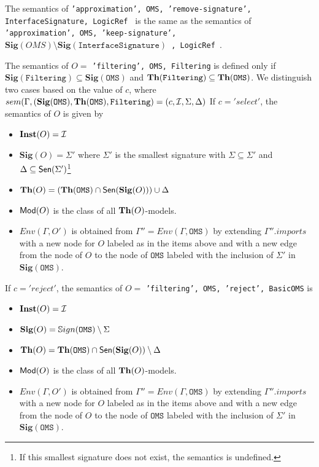 \documentclass[10pt,fleqn,%
\ifpretendfinal
final%
\else
draft%
\fi,
]{scrreprt}
\newcommand*{\syntax}[1]{\texttt{#1}}
\newcommand{\Sig}{\mathbf{Sig}}
\newcommand{\Inst}{\ensuremath{\mathbf{Inst}}}
\begin{document}
The semantics of 
\syntax{'approximation', OMS, 
'remove-signature', InterfaceSignature, LogicRef }
is the same as the semantics of
\syntax{'approximation', OMS, 
'keep-signature', $\Sig(OMS)\setminus \Sig(\syntax{InterfaceSignature})$ , LogicRef }.



The semantics of $O =$ 
\syntax{'filtering', OMS, Filtering} 
is
defined only if  $\Sig(\syntax{Filtering})\subseteq\Sig(\syntax{OMS})$ and $\Th(\syntax{Filtering})\subseteq\Th(\syntax{OMS})$.
We distinguish two cases based on the value of $c$, 
where $sem(\Gamma, (\Sig(\syntax{OMS}), \Th(\syntax{OMS}), \syntax{Filtering})
= (c, \cI, \Sigma, \Delta)$ 
If $c = 'select'$, 
the semantics of $O$ is given by
\begin{itemize}
  \item $\Inst(O) = \cI$
  \item $\Sig(O) = \Sigma'$ where $\Sigma'$ is the smallest signature
with $\Sigma\subseteq\Sigma'$ and $\Delta\subseteq\mathsf{Sen}(\Sigma')$\footnote
{If this smallest signature does not exist, the semantics is undefined.}
  \item $\Th(O) = (\Th(\syntax{OMS})\cap\Sen(\Sig(O)))\cup\Delta$
  \item $\mathsf{Mod}(O)$ is the class of all $\mathbf{Th}(O)$-models.
  \item $Env(\Gamma, O')$ is obtained from 
       $\Gamma'' = Env(\Gamma, \syntax{OMS})$
       by extending $\Gamma''.imports$
       with a new node for $O$ labeled as in the items above and
       with a new edge from the node of $O$ to the node of $\syntax{OMS}$
        labeled with the inclusion of $\Sigma'$ in $\Sig(\syntax{OMS})$.
\end{itemize}

\noindent
If $c = 'reject'$, the semantics of $O =$
\syntax{'filtering', OMS, 'reject', BasicOMS} is
\begin{itemize}
  \item $\Inst(O) = \cI$
  \item $\Sig(O) = \Sign(\syntax{OMS})\setminus \Sigma$ 
  \item $\Th(O) = \Th(\syntax{OMS})\cap\Sen(\Sig(O))\setminus\Delta$
  \item $\mathsf{Mod}(O)$ is the class of all $\mathbf{Th}(O)$-models.
    \item $Env(\Gamma, O')$ is obtained from 
       $\Gamma'' = Env(\Gamma, \syntax{OMS})$
       by extending $\Gamma''.imports$
       with a new node for $O$ labeled as in the items above and
       with a new edge from the node of $O$ to the node of $\syntax{OMS}$
        labeled with the inclusion of $\Sigma'$ in $\Sig(\syntax{OMS})$.
\end{itemize}
\end{document}
